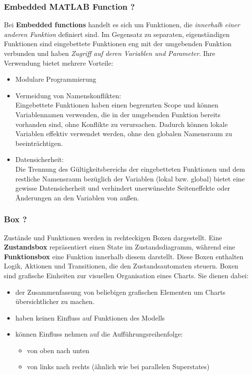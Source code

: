 \documentclass{article}
\begin{document}
\begin{multicols}{2}
			\subsubsection{Embedded MATLAB Function ?}
				Bei \textbf{Embedded functions} handelt es sich um Funktionen, die \textit{innerhalb einer anderen Funktion} definiert sind. Im Gegensatz zu separaten, eigenständigen Funktionen sind eingebettete Funktionen eng mit der umgebenden Funktion verbunden und haben \textit{Zugriff auf deren Variablen und Parameter}.
				Ihre Verwendung bietet mehrere Vorteile:
				\begin{itemize}
					\item Modulare Programmierung
					\item Vermeidung von Namenskonflikten: \\Eingebettete Funktionen haben einen begrenzten Scope und können Variablennamen verwenden, die in der umgebenden Funktion bereits vorhanden sind, ohne Konflikte zu verursachen. Dadurch können lokale Variablen effektiv verwendet werden, ohne den globalen Namensraum zu beeinträchtigen.
					\item Datensicherheit: \\Die Trennung des Gültigkeitsbereichs der eingebetteten Funktionen und dem restliche Namensraum bezüglich der Variablen (lokal bzw. global) bietet eine gewisse Datensicherheit und verhindert unerwünschte Seiteneffekte oder Änderungen an den Variablen von außen.
				\end{itemize}
			\subsubsection{Box ?}
				Zustände und Funktionen werden in rechteckigen Boxen dargestellt. Eine \textbf{Zustandsbox} repräsentiert einen State im Zustandsdiagramm, während eine \textbf{Funktionsbox} eine Funktion innerhalb diesem darstellt. Diese Boxen enthalten Logik, Aktionen und Transitionen, die den Zustandsautomaten steuern.
				Boxen sind grafische Einheiten zur visuellen Organisation eines Charts. Sie dienen dabei:
				\begin{itemize}
					\item der Zusammenfassung von beliebigen grafischen Elementen um Charts übersichtlicher zu machen.
					\item haben keinen Einfluss auf Funktionen des Modells
					\item können Einfluss nehmen auf die Aufführungsreihenfolge:
					\begin{itemize}
						\item von oben nach unten
						\item von links nach rechts (ähnlich wie bei parallelen Superstates)
					\end{itemize}
				\end{itemize} 

\end{multicols}
\end{document}
